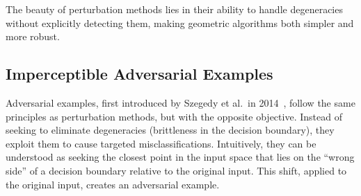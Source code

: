 \documentclass[a4paper, oneside]{discothesis}
\begin{document}
The beauty of perturbation methods lies in their ability to handle degeneracies without explicitly detecting them, making geometric algorithms both simpler and more robust.

\subsection{Imperceptible Adversarial Examples}

Adversarial examples, first introduced by Szegedy et al.\ in 2014~\cite{szegedy2013intriguing}, follow the same principles as perturbation methods, but with the opposite objective. Instead of seeking to eliminate degeneracies (brittleness in the decision boundary), they exploit them to cause targeted misclassifications. Intuitively, they can be understood as seeking the closest point in the input space that lies on the ``wrong side'' of a decision boundary relative to the original input. This shift, applied to the original input, creates an adversarial example.
\end{document}

